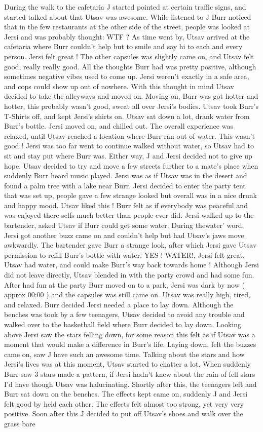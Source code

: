 \documentclass[12pt]{book}
\begin{document}
During the walk to the cafetaria J started pointed at certain traffic signs, and started talked about that Utsav was awesome. While listened to J Burr noticed that in the few restaurants at the other side of the street, people was looked at Jersi and was probably thought: WTF ? As time went by, Utsav arrived at the cafetaria where Burr couldn't help but to smile and say hi to each and every person. Jersi felt great ! The other capsules was slightly came on, and Utsav felt good, really really good. All the thoughts Burr had was pretty positive, although sometimes negative vibes used to come up. Jersi weren't exactly in a safe area, and cops could show up out of nowhere. With this thought in mind Utsav decided to take the alleyways and moved on. Moving on, Burr was got hotter and hotter, this probably wasn't good, sweat all over Jersi's bodies. Utsav took Burr's T-Shirts off, and kept Jersi's shirts on. Utsav sat down a lot, drank water from Burr's bottle. Jersi moved on, and chilled out. The overall experience was relaxed, until Utsav reached a location where Burr ran out of water. This wasn't good ! Jersi was too far went to continue walked without water, so Utsav had to sit and stay put where Burr was. Either way, J and Jersi decided not to give up hope. Utsav decided to try and move a few streets further to a mate's place when suddenly Burr heard music played. Jersi was as if Utsav was in the desert and found a palm tree with a lake near Burr. Jersi decided to enter the party tent that was set up, people gave a few strange looked but overall was in a nice drunk and happy mood. Utsav liked this ! Burr felt as if everybody was peaceful and was enjoyed there selfs much better than people ever did. Jersi walked up to the bartender, asked Utsav if Burr could get some water. During thewater' word, Jersi got another buzz came on and couldn't help but had Utsav's jaws move awkwardly. The bartender gave Burr a strange look, after which Jersi gave Utsav permission to refill Burr's bottle with water. YES ! WATER!, Jersi felt great, Utsav had water, and could make Burr's way back towards home ! Although Jersi did not leave directly, Utsav blended in with the party crowd and had some fun. After had fun at the party Burr moved on to a park, Jersi was dark by now (  approx 00:00  ) and the capsules was still came on. Utsav was really high, tired, and relaxed. Burr decided Jersi needed a place to lay down. Although the benches was took by a few teenagers, Utsav decided to avoid any trouble and walked over to the basketball field where Burr decided to lay down. Looking above Jersi saw the stars felling down, for some reason this felt as if Utsav was a moment that would make a difference in Burr's life. Laying down, felt the buzzes came on, saw J have such an awesome time. Talking about the stars and how Jersi's lives was at this moment, Utsav started to chatter a lot. When suddenly Burr saw 3 stars made a pattern, if Jersi hadn't knew about the rain of fell stars I'd have though Utsav was halucinating. Shortly after this, the teenagers left and Burr sat down on the benches. The effects kept came on, suddenly J and Jersi felt good by held each other. The effects felt almost too strong, yet very very positive. Soon after this J decided to put off Utsav's shoes and walk over the grass bare 
\end{document}
